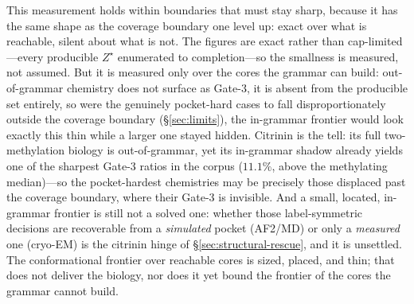 \documentclass[11pt]{article}
\theoremstyle{definition}
\newcommand{\zstar}{\ensuremath{Z^{\star}}}
\begin{document}
This measurement holds within boundaries that must stay sharp, because it has the same shape as the
coverage boundary one level up: exact over what is reachable, silent about what is not. The figures
are exact rather than cap-limited---every producible \zstar{} enumerated to completion---so the
smallness is measured, not assumed. But it is measured only over the cores the grammar can build:
out-of-grammar chemistry does not surface as Gate-3, it is absent from the producible set entirely,
so were the genuinely pocket-hard cases to fall disproportionately outside the coverage boundary
(\S\ref{sec:limits}), the in-grammar frontier would look exactly this thin while a larger one stayed
hidden. Citrinin is the tell: its full two-methylation biology is out-of-grammar, yet its in-grammar
shadow already yields one of the sharpest Gate-3 ratios in the corpus ($11.1\%$, above the
methylating median)---so the pocket-hardest chemistries may be precisely those displaced past the
coverage boundary, where their Gate-3 is invisible. And a small, located, in-grammar frontier is
still not a solved one: whether those label-symmetric decisions are recoverable from a \emph{simulated}
pocket (AF2/MD) or only a \emph{measured} one (cryo-EM) is the citrinin hinge of
\S\ref{sec:structural-rescue}, and it is unsettled. The conformational frontier over reachable cores
is sized, placed, and thin; that does not deliver the biology, nor does it yet bound the frontier of
the cores the grammar cannot build.

\appendix
\end{document}
